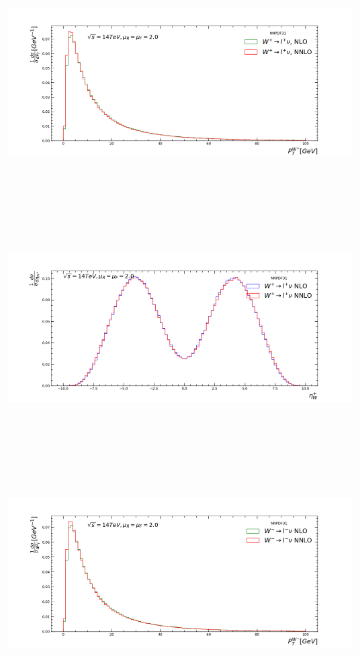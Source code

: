 \begin{figure}[H]
\centering
\begin{subfigure}{0.49\textwidth}
\includegraphics[height=6cm ,width=\textwidth]{chapter4/Wwppt_rf2_14.pdf}
\vspace*{-8mm}
\caption{}
\label{rf2pt1}
\end{subfigure}
\begin{subfigure}{0.49\textwidth}
\includegraphics[height=6cm, width=\textwidth]{chapter4/Wwpeta_rf2_14.pdf}
\vspace*{-8mm}
\caption{}
\label{rf2eta1}
\end{subfigure}
\begin{subfigure}{0.49\textwidth}
\includegraphics[height=6cm, width=\textwidth]{chapter4/Wwmpt_rf2_14.pdf}
\vspace*{-8mm}

\end{subfigure}
\end{figure}

